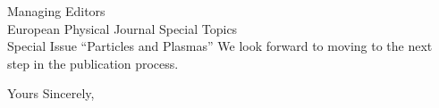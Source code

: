 \documentclass{letter}
\begin{document}
\begin{letter}{Managing Editors\\European Physical Journal Special Topics\\Special Issue ``Particles and Plasmas''}
We look forward to moving to the next step in the publication process.

\closing{Yours Sincerely,}

\end{letter}
\end{document}

